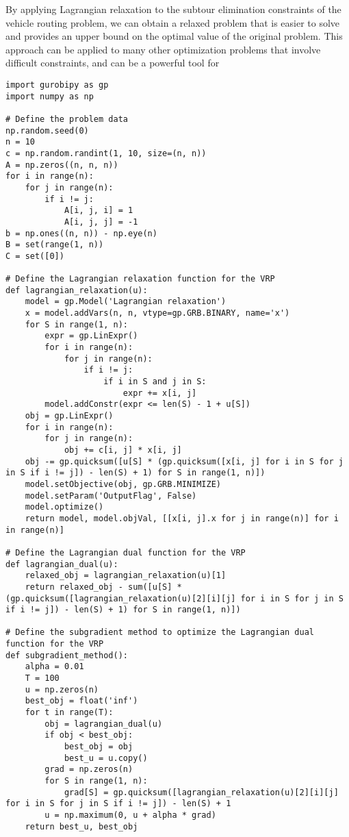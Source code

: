 By applying Lagrangian relaxation to the subtour elimination constraints of the vehicle routing problem, we can obtain a relaxed problem that is easier to solve and provides an upper bound on the optimal value of the original problem. This approach can be applied to many other optimization problems that involve difficult constraints, and can be a powerful tool for


\begin{verbatim}
import gurobipy as gp
import numpy as np

# Define the problem data
np.random.seed(0)
n = 10
c = np.random.randint(1, 10, size=(n, n))
A = np.zeros((n, n, n))
for i in range(n):
    for j in range(n):
        if i != j:
            A[i, j, i] = 1
            A[i, j, j] = -1
b = np.ones((n, n)) - np.eye(n)
B = set(range(1, n))
C = set([0])

# Define the Lagrangian relaxation function for the VRP
def lagrangian_relaxation(u):
    model = gp.Model('Lagrangian relaxation')
    x = model.addVars(n, n, vtype=gp.GRB.BINARY, name='x')
    for S in range(1, n):
        expr = gp.LinExpr()
        for i in range(n):
            for j in range(n):
                if i != j:
                    if i in S and j in S:
                        expr += x[i, j]
        model.addConstr(expr <= len(S) - 1 + u[S])
    obj = gp.LinExpr()
    for i in range(n):
        for j in range(n):
            obj += c[i, j] * x[i, j]
    obj -= gp.quicksum([u[S] * (gp.quicksum([x[i, j] for i in S for j in S if i != j]) - len(S) + 1) for S in range(1, n)])
    model.setObjective(obj, gp.GRB.MINIMIZE)
    model.setParam('OutputFlag', False)
    model.optimize()
    return model, model.objVal, [[x[i, j].x for j in range(n)] for i in range(n)]

# Define the Lagrangian dual function for the VRP
def lagrangian_dual(u):
    relaxed_obj = lagrangian_relaxation(u)[1]
    return relaxed_obj - sum([u[S] * (gp.quicksum([lagrangian_relaxation(u)[2][i][j] for i in S for j in S if i != j]) - len(S) + 1) for S in range(1, n)])

# Define the subgradient method to optimize the Lagrangian dual function for the VRP
def subgradient_method():
    alpha = 0.01
    T = 100
    u = np.zeros(n)
    best_obj = float('inf')
    for t in range(T):
        obj = lagrangian_dual(u)
        if obj < best_obj:
            best_obj = obj
            best_u = u.copy()
        grad = np.zeros(n)
        for S in range(1, n):
            grad[S] = gp.quicksum([lagrangian_relaxation(u)[2][i][j] for i in S for j in S if i != j]) - len(S) + 1
        u = np.maximum(0, u + alpha * grad)
    return best_u, best_obj


\end{verbatim}
